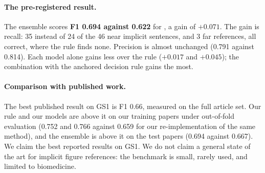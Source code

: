 \paragraph{The pre-registered result.} The ensemble scores \textbf{F1 0.694 against 0.622} for \bof{}, a gain
of $+0.071$. The gain is recall: 35 instead of 24 of the
46 near implicit sentences, and 3 far references, all correct, where the rule finds none. Precision is almost
unchanged (0.791 against 0.814). Each model alone gains less over the rule ($+0.017$ and $+0.045$); the
combination with the anchored decision rule gains the most.

\paragraph{Comparison with published work.} The best published result on GS1 is F1 0.66, measured on the full
article set. Our rule and our models are above it on our training papers under out-of-fold evaluation (0.752 and
0.766 against 0.659 for our re-implementation of the same method), and the ensemble is above it on the test
papers (0.694 against 0.667). We claim the best reported results on \figsum{} GS1. We do not claim a general
state of the art for implicit figure references: the benchmark is small, rarely used, and limited to
biomedicine.
